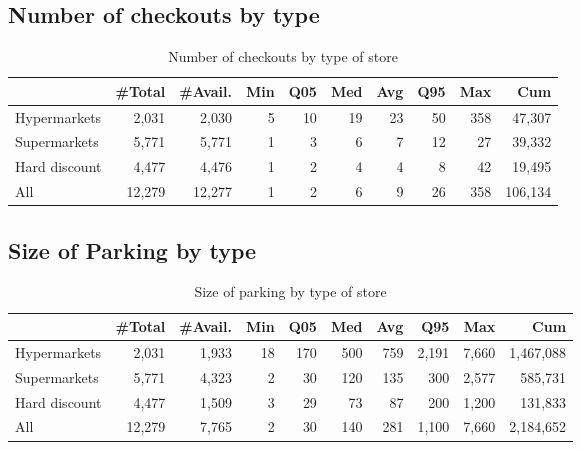\documentclass[11pt]{article}
\begin{document}
\subsection{Number of checkouts by type}

\begin{table}[H]
\caption{Number of checkouts by type of store}
\small

\begin{tabular}{lrrrrrrrrr}
\toprule
{} &     \#Total &    \#Avail. &        Min &        Q05 &        Med &        Avg &        Q95 &        Max &        Cum \\
\midrule
Hypermarkets  &      2,031 &      2,030 &          5 &         10 &         19 &         23 &         50 &        358 &     47,307 \\
Supermarkets  &      5,771 &      5,771 &          1 &          3 &          6 &          7 &         12 &         27 &     39,332 \\
Hard discount &      4,477 &      4,476 &          1 &          2 &          4 &          4 &          8 &         42 &     19,495 \\
\midrule
All           &     12,279 &     12,277 &          1 &          2 &          6 &          9 &         26 &        358 &    106,134 \\
\bottomrule
\end{tabular}

\end{table}


\subsection{Size of Parking by type}

\begin{table}[H]
\caption{Size of parking by type of store}
\small

\begin{tabular}{lrrrrrrrrr}
\toprule
{} &     \#Total &    \#Avail. &        Min &        Q05 &        Med &        Avg &        Q95 &        Max &        Cum \\
\midrule
Hypermarkets  &      2,031 &      1,933 &         18 &        170 &        500 &        759 &      2,191 &      7,660 &  1,467,088 \\
Supermarkets  &      5,771 &      4,323 &          2 &         30 &        120 &        135 &        300 &      2,577 &    585,731 \\
Hard discount &      4,477 &      1,509 &          3 &         29 &         73 &         87 &        200 &      1,200 &    131,833 \\
\midrule
All           &     12,279 &      7,765 &          2 &         30 &        140 &        281 &      1,100 &      7,660 &  2,184,652 \\
\bottomrule
\end{tabular}

\end{table}
\end{document}
